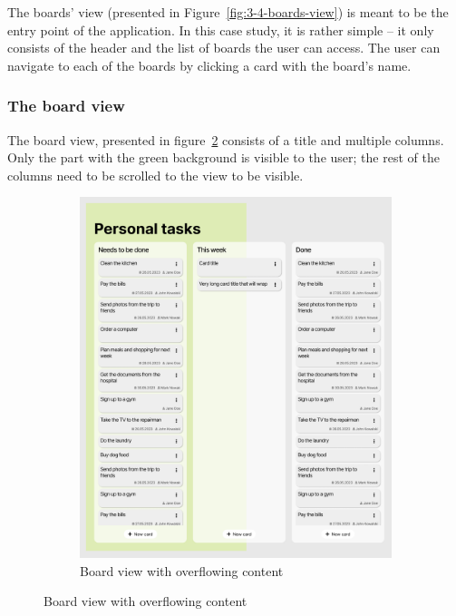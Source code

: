 The boards' view (presented in Figure~\ref{fig:3-4-boards-view}) is meant to be the entry point of the application.
In this case study, it is rather simple -- it only consists of the header and the list of boards the user can access.
The user can navigate to each of the boards by clicking a card with the board's name.

\subsubsection{The board view}
The board view, presented in figure~\ref{fig:3-4-board-view-expanded} consists of a title and multiple columns.
Only the part with the green background is visible to the user;
the rest of the columns need to be scrolled to the view to be visible.

\begin{figure}
    \centering
    \begin{subfigure}[m]{0.6\textwidth}
        \centering
        \includegraphics[height=0.4\textheight]{./3-research-methodology/board-view}
        \caption{Board view with overflowing content}
        \label{fig:3-4-board-view-expanded}
    \end{subfigure}

\end{figure}
